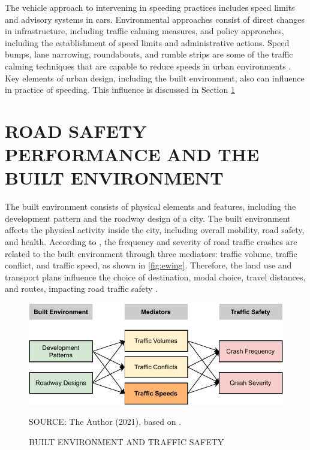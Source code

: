 The vehicle approach to intervening in speeding practices includes speed limits and advisory systems in cars. Environmental approaches consist of direct changes in infrastructure, including traffic calming measures, and policy approaches, including the establishment of speed limits and administrative actions. Speed bumps, lane narrowing, roundabouts, and rumble strips are some of the traffic calming techniques that are capable to reduce speeds in urban environments \cite{Welle2016}. Key elements of urban design, including the built environment, also can influence in practice of speeding. This influence is discussed in Section \ref{be}

\section{ROAD SAFETY PERFORMANCE AND THE BUILT ENVIRONMENT} \label{be}





The built environment consists of physical elements and features, including the development pattern and the roadway design of a city. The built environment affects the physical activity inside the city, including overall mobility, road safety, and health. According to \textcite{Ewing2009}, the frequency and severity of road traffic crashes are related to the built environment through three mediators: traffic volume, traffic conflict, and traffic speed, as shown in \autoref{fig:ewing}. Therefore, the land use and transport plans influence the choice of destination, modal choice, travel distances, and routes, impacting road traffic safety \cite{Tiwari}.  

\begin{figure}[!htbp]
    \centering\footnotesize
    \captionsetup{font=footnotesize}
    \caption{BUILT ENVIRONMENT AND TRAFFIC SAFETY}
    \includegraphics{fig/ewing.pdf}
    \label{fig:ewing}
    \par SOURCE: The Author (2021), based on \textcite{Ewing2009}.
\end{figure}

